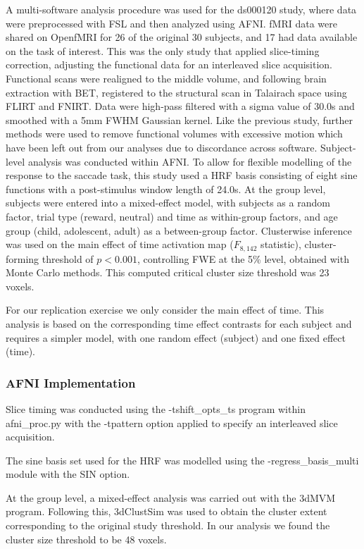 A multi-software analysis procedure was used for the ds000120 study, where data were preprocessed with FSL and then analyzed using AFNI. fMRI data were shared on OpenfMRI for 26 of the original 30 subjects, and 17 had data available on the task of interest. This was the only study that applied slice-timing correction, adjusting the functional data for an interleaved slice acquisition. Functional scans were realigned to the middle volume, and following brain extraction with BET, registered to the structural scan in Talairach space using FLIRT and FNIRT. Data were high-pass filtered with a sigma value of 30.0s and smoothed with a 5mm FWHM Gaussian kernel. Like the previous study, further methods were used to remove functional volumes with excessive motion which have been left out from our analyses due to discordance across software. Subject-level analysis was conducted within AFNI. To allow for flexible modelling of the response to the saccade task, this study used a HRF basis consisting of eight sine functions with a post-stimulus window length of 24.0s. At the group level, subjects were entered into a mixed-effect model, with subjects as a random factor, trial type (reward, neutral) and time as within-group factors, and age group (child, adolescent, adult) as a between-group factor. Clusterwise inference was used on the main effect of time activation map ($F_{8,142}$ statistic), cluster-forming threshold of $p < 0.001$, controlling FWE at the 5\% level, obtained with Monte Carlo methods. This computed critical cluster size threshold was 23 voxels. 

For our replication exercise we only consider the main effect of time.  This analysis is based on the corresponding time effect contrasts for each subject and requires a simpler model, with one random effect (subject) and one fixed effect (time). 


\subsubsection{AFNI Implementation}
Slice timing was conducted using the -tshift\_opts\_ts program within afni\_proc.py with the -tpattern option applied to specify an interleaved slice acquisition. 

The sine basis set used for the HRF was modelled using the -regress\_basis\_multi module with the SIN option.

At the group level, a mixed-effect analysis was carried out with the 3dMVM program. Following this, 3dClustSim was used to obtain the cluster extent corresponding to the original study threshold. In our analysis we found the cluster size threshold to be 48 voxels.


